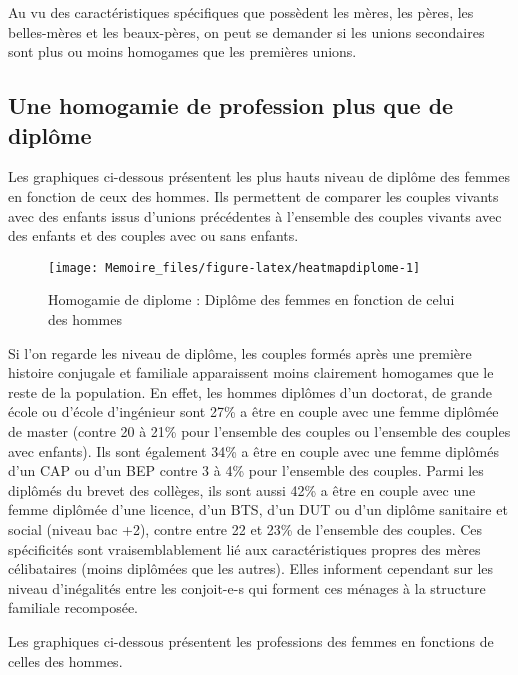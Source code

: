 \documentclass[
  12pt,
]{book}
\begin{document}
Au vu des caractéristiques spécifiques que possèdent les mères, les
pères, les belles-mères et les beaux-pères, on peut se demander si les
unions secondaires sont plus ou moins homogames que les premières
unions.

\subsection{Une homogamie de profession plus que de
diplôme}\label{une-homogamie-de-profession-plus-que-de-dipluxf4me}

Les graphiques ci-dessous présentent les plus hauts niveau de diplôme
des femmes en fonction de ceux des hommes. Ils permettent de comparer
les couples vivants avec des enfants issus d'unions précédentes à
l'ensemble des couples vivants avec des enfants et des couples avec ou
sans enfants.

\begin{figure}[h]

{\centering \texttt{[image: Memoire\_files/figure-latex/heatmapdiplome-1]} 

}

\caption{Homogamie de diplome : Diplôme des femmes en fonction de celui des hommes}\label{fig:heatmapdiplome}
\end{figure}

Si l'on regarde les niveau de diplôme, les couples formés après une
première histoire conjugale et familiale apparaissent moins clairement
homogames que le reste de la population. En effet, les hommes diplômes
d'un doctorat, de grande école ou d'école d'ingénieur sont 27\% a être
en couple avec une femme diplômée de master (contre 20 à 21\% pour
l'ensemble des couples ou l'ensemble des couples avec enfants). Ils sont
également 34\% a être en couple avec une femme diplômés d'un CAP ou d'un
BEP contre 3 à 4\% pour l'ensemble des couples. Parmi les diplômés du
brevet des collèges, ils sont aussi 42\% a être en couple avec une femme
diplômée d'une licence, d'un BTS, d'un DUT ou d'un diplôme sanitaire et
social (niveau bac +2), contre entre 22 et 23\% de l'ensemble des
couples. Ces spécificités sont vraisemblablement lié aux
caractéristiques propres des mères célibataires (moins diplômées que les
autres). Elles informent cependant sur les niveau d'inégalités entre les
conjoit-e-s qui forment ces ménages à la structure familiale recomposée.

Les graphiques ci-dessous présentent les professions des femmes en
fonctions de celles des hommes.
\end{document}
